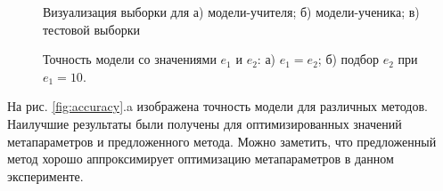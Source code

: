 \documentclass[12pt]{a&t}
\begin{document}
\begin{figure}[ht]
\begin{subfigure}[h]{0.325\linewidth}
    \end{subfigure}
    
    
    \caption{%
    Визуализация выборки для а) модели-учителя; б) модели-ученика; в) тестовой выборки}
    \label{fig:synth}
\end{figure}


\begin{figure}[ht]
    \begin{subfigure}[h]{0.5\linewidth}
    \label{fig:epoch_size}
    \end{subfigure}
    \begin{subfigure}[h]{0.5\linewidth}
    \label{fig:train_splines_every_epoch}
    \end{subfigure}
    \caption{%
    Точность модели со значениями $e_1$ и $e_2$: а) $e_1 = e_2$; б) подбор $e_2$ при $e_1 = 10$.}
    \label{fig:epoch_size}
\end{figure}
 

На рис. \ref{fig:accuracy}.a изображена точность модели для различных методов. Наилучшие результаты были получены для оптимизированных значений метапараметров и предложенного метода. Можно заметить, что предложенный метод хорошо аппроксимирует оптимизацию метапараметров в данном эксперименте.
\end{document}
